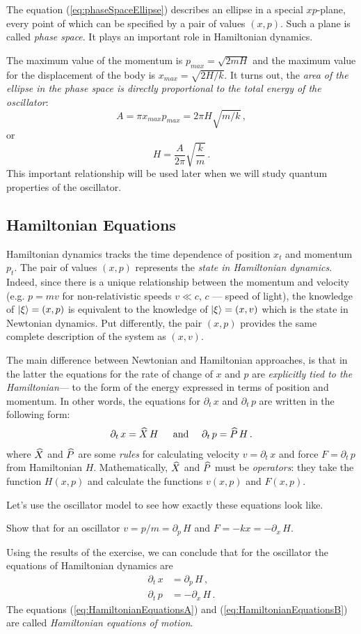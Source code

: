 The equation (\ref{eq:phaseSpaceEllipse}) describes an ellipse in a special $xp$-plane, every point of which can be specified by a pair of values $(x,p)$. Such a plane is called \emph{phase space}. It plays an important role in Hamiltonian dynamics.

The maximum value of the momentum is $p_{max}=\sqrt{2mH}$ and the maximum value for the displacement of the body is $x_{max}=\sqrt{2H/k}$. It turns out, the \emph{area of the ellipse in the phase space is directly proportional to the total energy of the oscillator}:
\[
A=\pi x_{max}p_{max}=2\pi H\sqrt{m/k}\,,
\] 
or
\[
H=\frac{A}{2\pi}\sqrt{\frac{k}{m}}\,.
\]
This important relationship will be used later when we will study quantum properties of the oscillator.

\subsection{Hamiltonian Equations}
Hamiltonian dynamics tracks the time dependence of position $x_t$ and momentum $p_t$. The pair of values $(x,p)$ represents the \emph{state in Hamiltonian dynamics}. Indeed, since there is a unique relationship between the momentum and velocity (e.g. $p=mv$ for non-relativistic speeds $v\ll c$, $c$ — speed of light), the knowledge of $|{\xi}\rangle=(x,p)$ is equivalent to  the knowledge of $|{\xi}\rangle=(x,v)$ which is the state in Newtonian dynamics. Put differently, the pair $(x,p)$ provides the same complete description of the system as $(x, v)$.

The main difference between Newtonian and Hamiltonian approaches, is that in the latter the equations for the rate of change of $x$ and $p$ are \emph{explicitly tied to the Hamiltonian}— to the form of the energy expressed in terms of position and momentum. In other words, the equations for $\partial_t\,x$ and $\partial_t\,p$ are written in the following  form:
\[
\partial_t\, x = \widehat{X}\,H\,\quad\textrm{ and }\quad \partial_t\, p = \widehat{P}\,H\,.
\]
where $\widehat{X}$ and $\widehat{P}$ are some \emph{rules} for calculating velocity $v=\partial_t\, x$  and force $F=\partial_t\,p$ from Hamiltonian $H$. Mathematically, $\widehat{X}$ and $\widehat{P}$ must be \emph{operators}: they take the function $H(x,p)$ and calculate the functions $v(x,p)$ and $F(x,p)$.

Let’s use the oscillator model to see how exactly these equations look like. 

\begin{exercise}
	Show that for an oscillator $v=p/m=\partial_p\, H$ and $F=-kx=-\partial_x\, H$.
\end{exercise}
Using the results of the exercise, we can conclude that for the oscillator the equations of Hamiltonian dynamics are
\begin{align}
	\label{eq:HamiltonianEquationsA}
	\partial_t\,x & =  \partial_p\, H\,,\\
	\partial_t\,p & = -\partial_x\, H\,. 
	\label{eq:HamiltonianEquationsB}
\end{align}
The equations (\ref{eq:HamiltonianEquationsA}) and (\ref{eq:HamiltonianEquationsB}) are called \emph{Hamiltonian equations of motion}.

